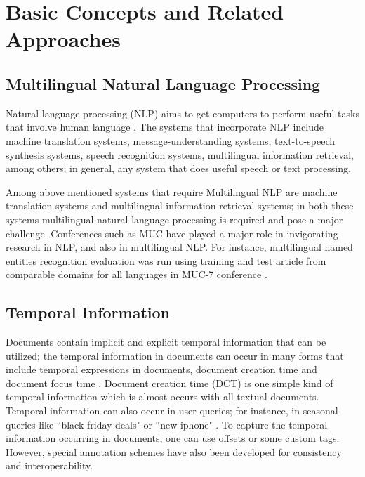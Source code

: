\chapter{Basic Concepts and Related Approaches} \label{the-chapter-2}
\section{Multilingual Natural Language Processing}
Natural language processing (NLP) aims to get computers to perform useful tasks that involve human language \cite{DBLP:books/lib/JurafskyM09}. The systems that incorporate NLP include machine translation systems, message-understanding systems, text-to-speech synthesis systems, speech recognition systems, multilingual information retrieval, among others; in general, any system that does useful speech or text processing.

Among above mentioned systems that require Multilingual NLP are machine translation systems and multilingual information retrieval systems; in both these systems multilingual natural language processing is required and pose a major challenge. Conferences such as MUC have played a major role in invigorating research in NLP, and also in multilingual NLP. For instance, multilingual named entities recognition evaluation was run using training and test article from comparable domains for all languages in MUC-7 conference \cite{chinchor1998overview}. 



\section{Temporal Information}
Documents contain implicit and explicit temporal information that can be utilized; the temporal information in documents can occur in many forms that include temporal expressions in documents, document creation time and document focus time \cite{DBLP:journals/ftir/KanhabuaBN15}. Document creation time (DCT) is one simple kind of temporal information which is almost occurs with all textual documents. Temporal information can also occur in user queries; for instance, in seasonal queries like ``black friday deals" or ``new iphone" \cite{DBLP:conf/sigir/Shokouhi11}. To capture the temporal information occurring in documents, one can use offsets or some custom tags. However, special annotation schemes have also been developed for consistency and interoperability. 

